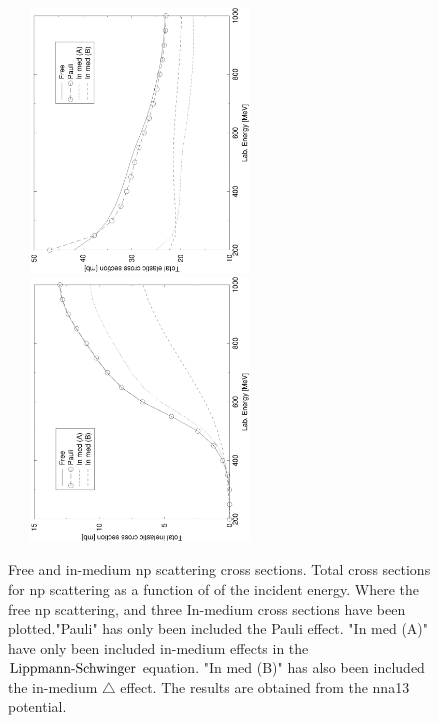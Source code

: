 \begin{figure}
\includegraphics[height=7cm,width=7cm,angle=-90]{iii_crossPhaseS.eps}
\qquad
\includegraphics[height=7cm,width=7cm,angle=-90]{iii_crossInEl.eps}
\caption{
\label{figInmediumCrossS}
Free and in-medium np scattering cross sections.
Total cross sections for np scattering as a function of of the incident energy. Where the free np scattering,
and three In-medium cross sections have been plotted."Pauli" has only been included
the Pauli effect. "In med (A)" have only been included in-medium effects in the
$\text{Lippmann-Schwinger}$ equation. "In med (B)" has also been included the in-medium $\triangle$ effect. The results are obtained from
the nna13 potential.
}
\end{figure}

